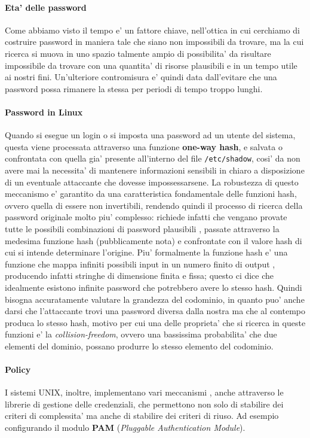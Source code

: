 \paragraph{Eta' delle password}
Come abbiamo visto il tempo e' un fattore chiave, nell'ottica in cui cerchiamo di costruire password in maniera tale che siano non impossibili da trovare, ma la cui ricerca si muova in uno spazio talmente ampio di possibilita' da risultare impossibile da trovare con una quantita' di risorse plausibili e in un tempo utile ai nostri fini. Un'ulteriore contromisura e' quindi data dall'evitare che una password possa rimanere la stessa per periodi di tempo troppo lunghi.

\paragraph{Password in Linux}
Quando si esegue un login o si imposta una password ad un utente del sistema, questa viene processata attraverso una funzione \textbf{one-way hash}, e salvata o confrontata con quella gia' presente all'interno del file \texttt{/etc/shadow}, cosi' da non avere mai la necessita' di mantenere informazioni sensibili in chiaro a disposizione di un eventuale attaccante che dovesse impossessarsene. La robustezza di questo meccanismo e' garantito da una caratteristica fondamentale delle funzioni hash, ovvero quella di essere non invertibili, rendendo quindi il processo di ricerca della password originale molto piu' complesso: richiede infatti che vengano provate tutte le possibili combinazioni di password plausibili , passate attraverso la medesima funzione hash (pubblicamente nota) e confrontate con il valore hash di cui si intende determinare l'origine. Piu' formalmente la funzione hash e' una funzione che mappa infiniti possibili input in un numero finito di output , producendo infatti stringhe di dimensione finita e fissa; questo ci dice che idealmente esistono infinite password che potrebbero avere lo stesso hash. Quindi bisogna accuratamente valutare la grandezza del codominio, in quanto puo' anche darsi che l'attaccante trovi una password diversa dalla nostra ma che al contempo produca lo stesso hash, motivo per cui una delle proprieta' che si ricerca in queste funzioni e' la \emph{collision-freedom}, ovvero una bassissima probabilita' che due elementi del dominio, possano produrre lo stesso elemento del codominio.

\paragraph{Policy}
I sistemi UNIX, inoltre, implementano vari meccanismi , anche attraverso le librerie di gestione delle credenziali, che permettono non solo di stabilire dei criteri di complessita' ma anche di stabilire dei criteri di riuso. Ad esempio configurando il modulo \textbf{PAM} (\emph{Pluggable Authentication Module}).


